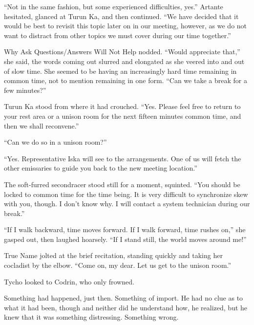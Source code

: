 ``Not in the same fashion, but some experienced difficulties, yes.'' Artante hesitated, glanced at Turun Ka, and then continued. ``We have decided that it would be best to revisit this topic later on in our meeting, however, as we do not want to distract from other topics we must cover during our time together.''

Why Ask Questions/Answers Will Not Help nodded. ``Would appreciate that,'' she said, the words coming out slurred and elongated as she veered into and out of slow time. She seemed to be having an increasingly hard time remaining in common time, not to mention remaining in one form. ``Can we take a break for a few minutes?''

Turun Ka stood from where it had crouched. ``Yes. Please feel free to return to your rest area or a unison room for the next fifteen minutes common time, and then we shall reconvene.''

``Can we do so in a unison room?''

``Yes. Representative Iska will see to the arrangements. One of us will fetch the other emissaries to guide you back to the new meeting location.''

The soft-furred secondracer stood still for a moment, squinted. ``You should be locked to common time for the time being. It is very difficult to synchronize skew with you, though. I don't know why. I will contact a system technician during our break.''

``If I walk backward, time moves forward. If I walk forward, time rushes on,'' she gasped out, then laughed hoarsely. ``If I stand still, the world moves around me!''

True Name jolted at the brief recitation, standing quickly and taking her cocladist by the elbow. ``Come on, my dear. Let us get to the unison room.''

Tycho looked to Codrin, who only frowned.

Something had happened, just then. Something of import. He had no clue as to what it had been, though and neither did he understand how, he realized, but he knew that it was something distressing. Something wrong.
